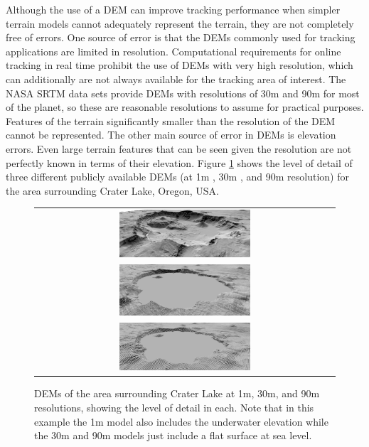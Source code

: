 \documentclass[journal]{IEEEtran}
\begin{document}
Although the use of a DEM can improve tracking performance when simpler terrain models cannot adequately represent the terrain, they are not completely free of errors. One source of error is that the DEMs commonly used for tracking applications are limited in resolution. Computational requirements for online tracking in real time prohibit the use of DEMs with very high resolution, which can additionally are not always available for the tracking area of interest. The NASA SRTM data sets provide DEMs with resolutions of 30m \cite{jpl13} and 90m \cite{nasa00} for most of the planet, so these are reasonable resolutions to assume for practical purposes. Features of the terrain significantly smaller than the resolution of the DEM cannot be represented. The other main source of error in DEMs is elevation errors. Even large terrain features that can be seen given the resolution are not perfectly known in terms of their elevation. Figure \ref{fig:demexamples} shows the level of detail of three different publicly available DEMs (at 1m \cite{robinson2012high}, 30m \cite{jpl13}, and 90m \cite{nasa00} resolution) for the area surrounding Crater Lake, Oregon, USA.

\begin{figure}[ht]
\centering
  \begin{tabular} {@{}c@{}}
    \includegraphics[width=0.45\textwidth]{craterlake_highres_crop.png} \\
    \includegraphics[width=0.45\textwidth]{craterlake_30m_crop.png} \\
    \includegraphics[width=0.45\textwidth]{craterlake_90m_crop.png} \\
  \end{tabular}
  \caption{DEMs of the area surrounding Crater Lake at 1m, 30m, and 90m resolutions, showing the level of detail in each. Note that in this example the 1m model also includes the underwater elevation while the 30m and 90m models just include a flat surface at sea level.}
  \label{fig:demexamples}
\end{figure}
\end{document}
